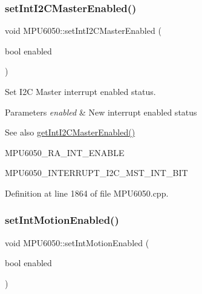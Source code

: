 \mbox{\label{classMPU6050_af238656844a3727fa96a8d434b55473e}} 
\subsubsection{\texorpdfstring{setIntI2CMasterEnabled()}{setIntI2CMasterEnabled()}}
{\footnotesize\ttfamily void M\+P\+U6050\+::set\+Int\+I2\+C\+Master\+Enabled (\begin{DoxyParamCaption}\item[{bool}]{enabled }\end{DoxyParamCaption})}



Set I2C Master interrupt enabled status. 


\begin{DoxyParams}{Parameters}
{\em enabled} & New interrupt enabled status \\
\hline
\end{DoxyParams}
\begin{DoxySeeAlso}{See also}
\mbox{\hyperlink{classMPU6050_a282ae29e029d88604a59c92bdf9ce252}{get\+Int\+I2\+C\+Master\+Enabled()}} 

M\+P\+U6050\+\_\+\+R\+A\+\_\+\+I\+N\+T\+\_\+\+E\+N\+A\+B\+LE 

M\+P\+U6050\+\_\+\+I\+N\+T\+E\+R\+R\+U\+P\+T\+\_\+\+I2\+C\+\_\+\+M\+S\+T\+\_\+\+I\+N\+T\+\_\+\+B\+IT 
\end{DoxySeeAlso}


Definition at line 1864 of file M\+P\+U6050.\+cpp.

\mbox{\label{classMPU6050_a2d2d1d3b03198a09c83a48ec3bc20bd8}} 
\subsubsection{\texorpdfstring{setIntMotionEnabled()}{setIntMotionEnabled()}}
{\footnotesize\ttfamily void M\+P\+U6050\+::set\+Int\+Motion\+Enabled (\begin{DoxyParamCaption}\item[{bool}]{enabled }\end{DoxyParamCaption})}




